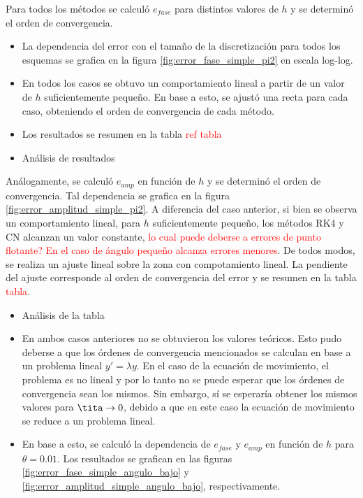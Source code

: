 \documentclass[aps,prb,twocolumn,superscriptaddress,floatfix,longbibliography]{revtex4-2}
\newcounter{para}
\begin{document}
Para todos los métodos se calculó $e_{fase}$ para distintos valores de $h$ y se determinó el orden de convergencia. 
\begin{itemize}
  \item La dependencia del error con el tamaño de la discretización para todos los esquemas se grafica en la figura \ref{fig:error_fase_simple_pi2} en escala log-log. \item En todos los casos se obtuvo un comportamiento lineal a partir de un valor de $h$ suficientemente pequeño. En base a esto, se ajustó una recta para cada caso, obteniendo el orden de convergencia de cada método.
  \item Los resultados se resumen en la tabla \textcolor{red}{ref tabla}
  \item Análisis de resultados
\end{itemize}




Análogamente, se calculó $e_{amp}$ en función de $h$ y se determinó el orden de convergencia. Tal dependencia se grafica en la figura \ref{fig:error_amplitud_simple_pi2}. A diferencia del caso anterior, si bien se observa un comportamiento lineal, para $h$ suficientemente pequeño, los métodos RK4 y CN alcanzan un valor constante, \textcolor{red}{lo cual puede deberse a errores de punto flotante? En el caso de ángulo pequeño alcanza errores menores}. De todos modos, se realiza un ajuste lineal sobre la zona con compotamiento lineal. La pendiente del ajuste corresponde al orden de convergencia del error y se resumen en la tabla \textcolor{red}{tabla}.
\begin{itemize}
  \item Análisis de la tabla
\end{itemize}



\begin{itemize}
  \item En ambos casos anteriores no se obtuvieron los valores teóricos. Esto pudo deberse a que los órdenes de convergencia mencionados se calculan en base a un problema lineal $y' = \lambda y$. En el caso de la ecuación de movimiento, el problema es no lineal y por lo tanto no se puede esperar que los órdenes de convergencia sean los mismos. Sin embargo, sí se esperaría obtener los mismos valores para $\tita \rightarrow 0$, debido a que en este caso la ecuación de movimiento se reduce a un problema lineal.
  \item En base a esto, se calculó la dependencia de $e_{fase}$ y $e_{amp}$ en función de $h$ para $\theta = 0.01$. Los resultados se grafican en las figuras \ref{fig:error_fase_simple_angulo_bajo} y \ref{fig:error_amplitud_simple_angulo_bajo}, respectivamente. 
\end{itemize}
\end{document}
